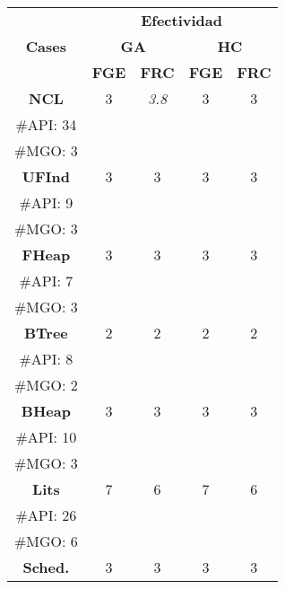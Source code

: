 \begin{table}[H]
\centering
\scriptsize
\begin{tabular}{c ccccc}
\midrule
\multicolumn{2}{c}{\multirow{3}{*}{\textbf{Cases}}} & \multicolumn{4}{c}{\textbf{Efectividad}} \\
\cline{3-6}
\multicolumn{2}{c}{} & \multicolumn{2}{c}{\textbf{GA}} & \multicolumn{2}{c}{\textbf{HC}}  \\
\multicolumn{2}{c}{} & \textbf{\tiny{FGE}} & \textbf{\tiny{FRC}} & \textbf{\tiny{FGE}} & \textbf{\tiny{FRC}}  \\
\midrule
\multicolumn{2}{c}{\textbf{NCL}} & 3  &   \cellcolor{gray!25} \emph{3.8} & 3 &  3 \\
\multicolumn{2}{c}{\tiny \#API: 34} &  &   & &    \\
\multicolumn{2}{c}{\tiny \#MGO: 3} &  &   & &    \\

\midrule
\multicolumn{2}{c}{\textbf{UFInd}}& 3 & 3  & 3  & 3      \\
\multicolumn{2}{c}{\tiny \#API: 9} &  &   & &   \\
\multicolumn{2}{c}{\tiny \#MGO: 3} &  &   & &    \\
\midrule

\multicolumn{2}{c}{\textbf{FHeap}}& 3 & 3  &  3 &  3   \\
\multicolumn{2}{c}{\tiny \#API: 7} &  &   & &    \\
\multicolumn{2}{c}{\tiny \#MGO: 3} &  &   & &    \\
\midrule
\multicolumn{2}{c}{\textbf{BTree}} & 2 & 2  &  2 &  2   \\
\multicolumn{2}{c}{\tiny \#API: 8} &  &   & &    \\
\multicolumn{2}{c}{\tiny \#MGO: 2} &  &   & &    \\
\midrule
\multicolumn{2}{c}{\textbf{BHeap}}& 3 & 3 &  3 &  3    \\
\multicolumn{2}{c}{\tiny \#API: 10} &  &   & &   \\
\multicolumn{2}{c}{\tiny \#MGO: 3} &  &   & &   \\
\midrule
\multicolumn{2}{c}{\textbf{Lits}} &  7 & 6 & 7 &  6    \\
\multicolumn{2}{c}{\tiny \#API: 26} &  &   & &    \\
\multicolumn{2}{c}{\tiny \#MGO: 6} &  &   & &   \\
\midrule
\multicolumn{2}{c}{\textbf{Sched.}} &  3 & 3   & 3  &  3 \\


\end{tabular}
\end{table}
